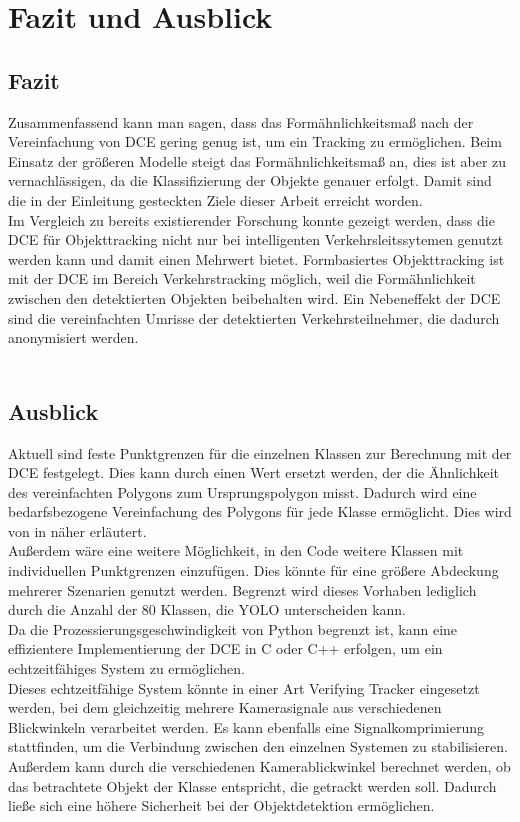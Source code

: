 \chapter{Fazit und Ausblick}
\label{ch:conclusion}
\section{Fazit}
{ 
    Zusammenfassend kann man sagen, dass das Formähnlichkeitsmaß nach der Vereinfachung von DCE gering genug ist, um ein Tracking zu ermöglichen. Beim Einsatz der größeren Modelle steigt das Formähnlichkeitsmaß an, dies ist aber zu vernachlässigen, da die Klassifizierung der Objekte genauer erfolgt.  Damit sind die in der Einleitung gesteckten Ziele dieser Arbeit erreicht worden. \\ Im Vergleich zu bereits existierender Forschung konnte gezeigt werden, dass die DCE für Objekttracking nicht nur bei intelligenten Verkehrsleitssytemen genutzt werden kann und damit einen Mehrwert bietet. 
	Formbasiertes Objekttracking ist mit der DCE im Bereich Verkehrstracking möglich, weil die Formähnlichkeit zwischen den detektierten Objekten beibehalten wird. Ein Nebeneffekt der DCE sind die vereinfachten Umrisse der detektierten Verkehrsteilnehmer, die dadurch anonymisiert werden. \\
\\
	

    }
\section{Ausblick}
{
	Aktuell sind feste Punktgrenzen für die einzelnen Klassen zur Berechnung mit der DCE festgelegt. Dies kann durch einen Wert ersetzt werden, der die Ähnlichkeit des vereinfachten Polygons zum Ursprungspolygon misst. Dadurch wird eine bedarfsbezogene Vereinfachung des Polygons für jede Klasse ermöglicht. Dies wird von \citeauthor{Latecki2003} in  \citep{Latecki2003} näher erläutert. \\
	Außerdem wäre eine weitere Möglichkeit, in den Code weitere Klassen mit individuellen Punktgrenzen einzufügen. Dies könnte für eine größere Abdeckung mehrerer Szenarien genutzt werden. Begrenzt wird dieses Vorhaben lediglich durch die Anzahl der 80 Klassen, die YOLO unterscheiden kann. \\
	Da die Prozessierungsgeschwindigkeit von Python begrenzt ist, kann eine effizientere Implementierung der DCE in C oder C++ erfolgen, um ein echtzeitfähiges System zu ermöglichen. \\
	Dieses echtzeitfähige System könnte in einer Art \glqq Verifying Tracker\grqq{} eingesetzt werden, bei dem gleichzeitig mehrere Kamerasignale aus verschiedenen Blickwinkeln verarbeitet werden. Es kann ebenfalls eine Signalkomprimierung stattfinden, um die Verbindung zwischen den einzelnen Systemen zu stabilisieren.  Außerdem kann durch die verschiedenen Kamerablickwinkel berechnet werden, ob das betrachtete Objekt der Klasse entspricht, die getrackt werden soll. Dadurch ließe sich eine höhere Sicherheit bei der Objektdetektion ermöglichen. 

}

